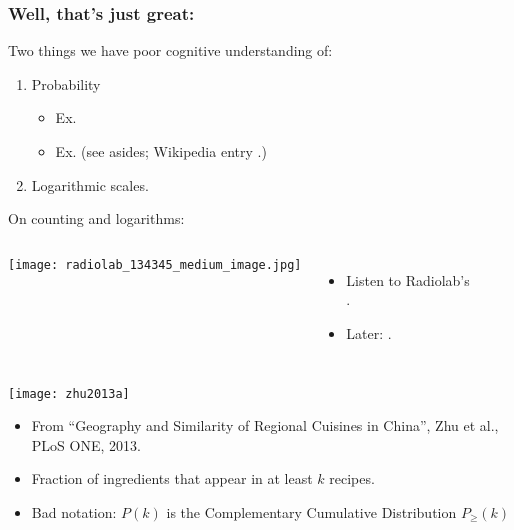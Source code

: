 \begin{frame}
  \frametitle{Well, that's just great:}

  \begin{block}{Two things we have poor cognitive understanding of:}
    \begin{enumerate}
    \item 
      Probability
      \begin{itemize}
      \item 
        Ex. 
      \item
        Ex.  \newline
        {\small(see asides; Wikipedia entry .)}
      \end{itemize}
    \item  
      Logarithmic scales.
    \end{enumerate}
  \end{block}

  \begin{block}{On counting and logarithms:}
    \begin{columns}
      \texttt{[image: radiolab\_134345\_medium\_image.jpg]}
      \begin{itemize}
      \item 
        Listen to Radiolab's\\ 
        .
      \item 
        Later: .
      \end{itemize}
    \end{columns}
  \end{block}
  
\end{frame}

\begin{frame}
  \texttt{[image: zhu2013a]}

  \begin{itemize}
  \item 
    From ``Geography and Similarity of Regional Cuisines in China''\cite{zhu2013a},
    Zhu et al., PLoS ONE, 2013.
  \item 
    Fraction of ingredients that appear in at least $k$ recipes.
  \item 
    Bad notation: $P(k)$ is the Complementary Cumulative Distribution $P_{\ge}(k)$ 
  \end{itemize}

\end{frame}


